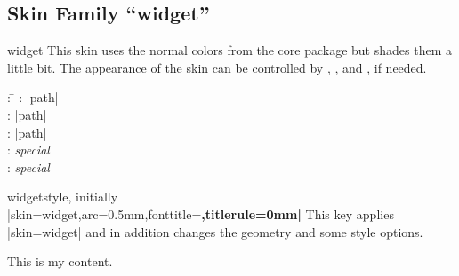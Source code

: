 \clearpage
\subsection{Skin Family \enquote{widget}}
\begin{docSkin}{widget}
  This skin uses the normal colors from the core package but shades
  them a little bit.
  The appearance of the skin can be controlled by ,
  , and ,
  if needed.
\begin{tcolorbox}[skintable=widget]
  \begin{tabbing}
    : \=\kill
    :           \> |path|\\
    : \> |path|\\ 
    :        \> |path|\\
    :    \> \emph{special}\\
    :           \> \emph{special}
  \end{tabbing}
\end{tcolorbox}
\end{docSkin}


\begin{docTcbKey}[][doc updated={2020-09-23}]{widget}{}{style, initially\\
  |skin=widget,arc=0.5mm,fonttitle=\bfseries,titlerule=0mm|
}
  This key applies |skin=widget| and in addition changes the geometry and some style options.
\end{docTcbKey}


\begin{dispExample}
\end{dispExample}


\begin{dispExample}
\begin{tcolorbox}[widget,colback=Salmon!50!white,colframe=FireBrick!75!black,
  adjusted title=A colored box with the \enquote{widget} skin]
This is my content.
\end{tcolorbox}
\end{dispExample}

\clearpage

